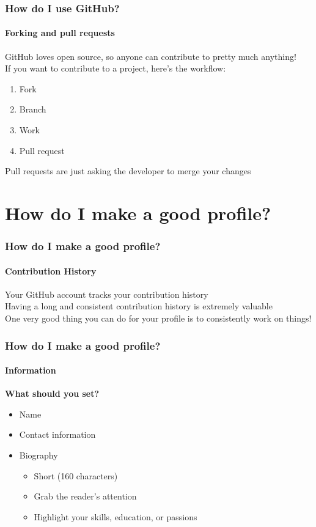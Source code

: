 \documentclass{beamer}
\begin{document}
\begin{frame}
  \frametitle{How do I use GitHub?}
  \framesubtitle{Forking and pull requests}
  GitHub loves open source, so anyone can contribute to pretty much anything!\\\pause\vspace{0.25em}
  If you want to contribute to a project, here's the workflow:
  \begin{enumerate}[<+->]
    \item Fork
    \item Branch
    \item Work
    \item Pull request
  \end{enumerate}\pause
  Pull requests are just asking the developer to merge your changes
\end{frame}

\section{How do I make a good profile?}
\begin{frame}
  \frametitle{How do I make a good profile?}
  \framesubtitle{Contribution History}
  Your GitHub account tracks your contribution history\\\pause\vspace{0.25em}
  Having a long and consistent contribution history is extremely valuable\\\pause\vspace{0.25em}
  One very good thing you can do for your profile is to consistently work on things!
\end{frame}

\begin{frame}
  \frametitle{How do I make a good profile?}
  \framesubtitle{Information}
  \textbf{What should you set?}\pause
  \begin{itemize}[<+->]
    \item Name
    \item Contact information
    \item Biography
    \begin{itemize}
      \item Short (160 characters)
      \item Grab the reader's attention
      \item Highlight your skills, education, or passions
    \end{itemize}
  \end{itemize}
\end{frame}
\end{document}
